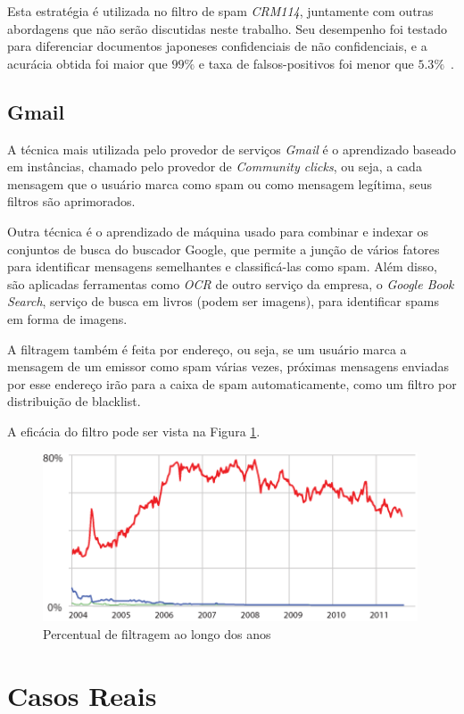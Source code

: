 \documentclass[a4paper,dvipdfm]{article}
\begin{document}
	Esta estratégia é utilizada no filtro de spam \emph{CRM114}, juntamente com outras abordagens que não serão discutidas neste trabalho. Seu desempenho foi testado para diferenciar documentos japoneses confidenciais de não confidenciais, e a acurácia obtida foi maior que $99\%$ e taxa de falsos-positivos foi menor que $5.3\%$~\cite{fmarkov:japtest}.

	\subsection{Gmail}
		A técnica mais utilizada pelo provedor de serviços \emph{Gmail} é o aprendizado baseado em instâncias, chamado pelo provedor de \emph{Community clicks}, ou seja, a cada mensagem que o usuário marca como spam ou como mensagem legítima, seus filtros são aprimorados.

		Outra técnica é o aprendizado de máquina usado para combinar e indexar os conjuntos de busca do buscador Google, que permite a junção de vários fatores para identificar mensagens semelhantes e classificá-las como spam.
		Além disso, são aplicadas ferramentas como \emph{OCR} de outro serviço da empresa, o \emph{Google Book Search}, serviço de busca em livros (podem ser imagens), para identificar spams em forma de imagens.

		A filtragem também é feita por endereço, ou seja, se um usuário marca a mensagem de um emissor como spam várias vezes, próximas mensagens enviadas por esse endereço irão para a caixa de spam automaticamente, como um filtro por distribuição de blacklist.

		A eficácia do filtro pode ser vista na Figura \ref{gmail:chart}.

		\begin{figure}[ht]
			\centering
			\includegraphics[height=5cm]{Imagens/gmail/spamchart.png}
			\caption{Percentual de filtragem ao longo dos anos}
			\label{gmail:chart}
		\end{figure}
		

\section{Casos Reais}
\end{document}

